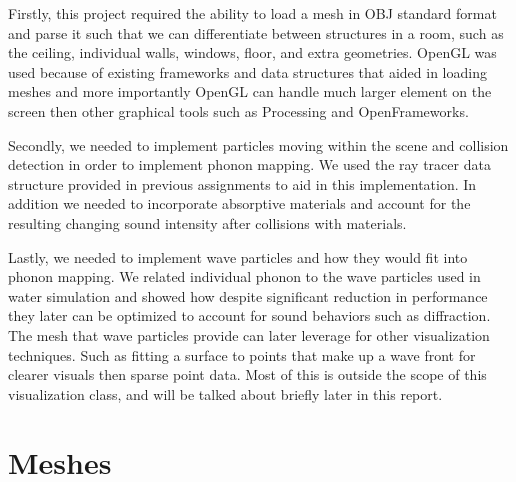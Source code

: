 \documentclass{thesis}
\begin{document}
Firstly, this project required the ability to load a mesh in OBJ standard format and parse it such that we can differentiate between structures in a room, such as the ceiling, individual walls, windows, floor, and extra geometries. OpenGL was used  because of existing frameworks and data structures that aided in loading meshes and more importantly OpenGL can handle much larger element on the screen then other graphical tools such as Processing and OpenFrameworks. 

Secondly, we needed to implement particles moving within the scene and collision detection in order to implement phonon mapping. 
We used the ray tracer data structure provided in previous assignments to aid in this implementation. In addition we needed to incorporate absorptive materials and account for the resulting changing sound intensity after collisions with materials. 

Lastly, we needed to implement wave particles and how they would fit into phonon mapping. We related individual phonon to the wave particles used in water simulation and showed how despite significant reduction in performance they later can be optimized to account for sound behaviors such as diffraction. The mesh that wave particles provide can later leverage for other visualization techniques. Such as fitting a surface to points that make up a wave front for clearer visuals then sparse point data. Most of this is outside the scope of this visualization class, and will be talked about briefly later in this report.

\section{Meshes}
\end{document}

